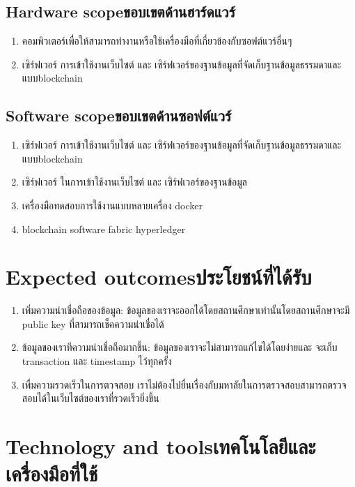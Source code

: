 \subsection{\ifenglish Hardware scope\else ขอบเขตด้านฮาร์ดแวร์\fi}
\begin{enumerate}
    \item คอมพิวเตอร์เพื่อให้สามารถทํางานหรือใช้เครื่องมือที่เกี่ยวข้องกับซอฟต์แวร์อื่นๆ
    \item เซิร์ฟเวอร์ การเข้าใช้งานเว็บไซต์ และ เซิร์ฟเวอร์ของฐานข้อมูลที่จัดเก็บฐานข้อมูลธรรมดาและแบบblockchain
\end{enumerate}
\subsection{\ifenglish Software scope\else ขอบเขตด้านซอฟต์แวร์\fi}
\begin{enumerate}
    \item เซิร์ฟเวอร์ การเข้าใช้งานเว็บไซต์ และ เซิร์ฟเวอร์ของฐานข้อมูลที่จัดเก็บฐานข้อมูลธรรมดาและแบบblockchain
    \item เซิร์ฟเวอร์ ในการเข้าใช้งานเว็บไซต์ และ เซิร์ฟเวอร์ของฐานข้อมูล
    \item เครื่องมือทดสอบการใช้งานแบบหลายเครื่อง docker
    \item blockchain software fabric hyperledger
\end{enumerate}
\section{\ifenglish Expected outcomes\else ประโยชน์ที่ได้รับ\fi}
\begin{enumerate}
    \item เพิ่มความน่าเชื่อถือของข้อมูล: ข้อมูลของเราจะออกได้โดยสถานศึกษาเท่านั้นโดยสถานศึกษาจะมี
     public key ที่สามารถเช็คความน่าเชื่อได้
    \item ข้อมูลของเราทีความน่าเชื่อถือมากขึ้น: ข้อมูลของเราจะไม่สามารถแก้ไขได้โดยง่ายและ
    จะเก็บ transaction และ timestamp ไว้ทุกครั้ง
    \item เพื่มความรวดเร็วในการตวจสอบ เราไม่ต้องไปยื่นเรื่องกับมหาลัยในการตรวจสอบสามารถตรวจสอบได้ในเว็บไซต์ของเราที่รวดเร็วยิ่งขึ้น
\end{enumerate}
\section{\ifenglish Technology and tools\else เทคโนโลยีและเครื่องมือที่ใช้\fi}


